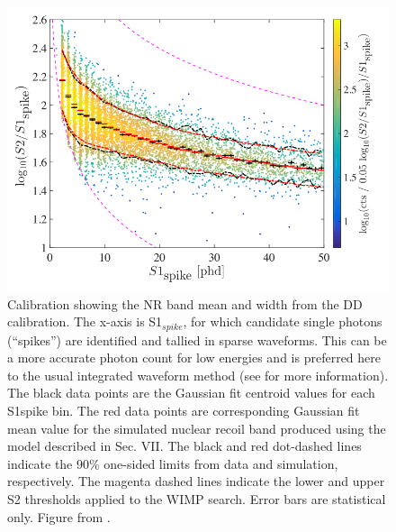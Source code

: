 \begin{figure}[htbp]
\begin{center}
\includegraphics[width=\textwidth]{figures/lux/lux_nrband.png}
\caption{Calibration showing the \acs{NR} band mean and width from the \acs{DD} calibration. The x-axis is S1$_{spike}$, for which candidate single photons (``spikes'') are identified and tallied in sparse waveforms. This can be a more accurate photon count for low energies and is preferred here to the usual integrated waveform method (see \cite{LUXReanalysis} for more information). The black data points are the Gaussian fit centroid values for each S1spike bin. The red data points are corresponding Gaussian fit mean value for the simulated nuclear recoil band produced using the model described in Sec. VII. The black and red dot-dashed lines indicate the 90\% one-sided limits from data and simulation, respectively. The magenta dashed lines indicate the lower and upper S2 thresholds applied to the \acs{WIMP} search. Error bars are statistical only. Figure from \cite{LUXDD}.}
\label{fig:lux_nrband}
\end{center}
\end{figure}



\FloatBarrier
